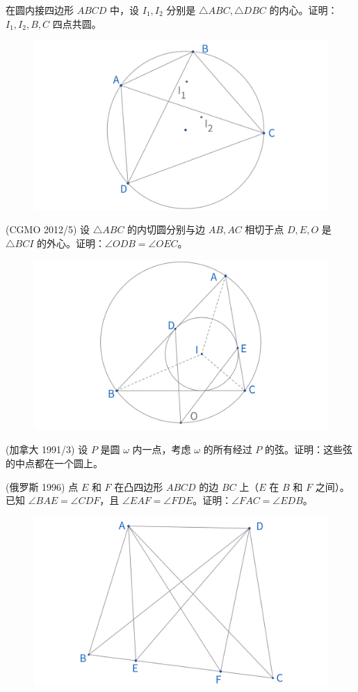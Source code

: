 \begin{exercise}
在圆内接四边形 $ABCD$ 中，设 $I_1, I_2$ 分别是 $\triangle ABC, \triangle DBC$ 的内心。证明：$I_1, I_2, B, C$ 四点共圆。
\end{exercise}
\begin{figure}[H]
    \centering
    \includegraphics[width=0.7\linewidth]{figures/exercises/004.png}
\end{figure}

\newpage 
\begin{exercise}
(CGMO 2012/5) 设 $\triangle ABC$ 的内切圆分别与边 $AB, AC$ 相切于点 $D, E, O$ 是 $\triangle BCI$ 的外心。证明：$\angle ODB = \angle OEC$。
\end{exercise}
\begin{figure}[H]
    \centering
    \includegraphics[width=0.7\linewidth]{figures/exercises/005.png}
\end{figure}


\begin{exercise}
(加拿大 1991/3) 设 $P$ 是圆 $\omega$ 内一点，考虑 $\omega$ 的所有经过 $P$ 的弦。证明：这些弦的中点都在一个圆上。
\end{exercise}


\begin{exercise}
(俄罗斯 1996) 点 $E$ 和 $F$ 在凸四边形 $ABCD$ 的边 $BC$ 上（$E$ 在 $B$ 和 $F$ 之间）。已知 $\angle BAE = \angle CDF$，且 $\angle EAF = \angle FDE$。证明：$\angle FAC = \angle EDB$。
\end{exercise}
\begin{figure}[H]
    \centering
    \includegraphics[width=0.7\linewidth]{figures/exercises/006.png}
\end{figure}

